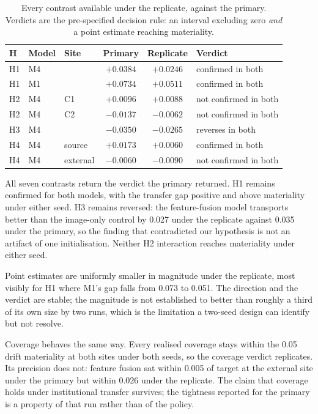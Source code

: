 \begin{table}[htbp]
\centering
\caption{Every contrast available under the replicate, against the primary.
Verdicts are the pre-specified decision rule: an interval excluding zero
\emph{and} a point estimate reaching materiality.}
\label{tab:seed-replicate}
\begin{tabular}{lllccl}
\toprule
H & Model & Site & Primary & Replicate & Verdict \\
\midrule
H1 & M4 &          & $+0.0384$ & $+0.0246$ & confirmed in both \\
H1 & M1 &          & $+0.0734$ & $+0.0511$ & confirmed in both \\
H2 & M4 & C1       & $+0.0096$ & $+0.0088$ & not confirmed in both \\
H2 & M4 & C2       & $-0.0137$ & $-0.0062$ & not confirmed in both \\
H3 & M4 &          & $-0.0350$ & $-0.0265$ & reverses in both \\
H4 & M4 & source   & $+0.0173$ & $+0.0060$ & confirmed in both \\
H4 & M4 & external & $-0.0060$ & $-0.0090$ & not confirmed in both \\
\bottomrule
\end{tabular}
\end{table}

All seven contrasts return the verdict the primary returned. H1 remains
confirmed for both models, with the transfer gap positive and above materiality
under either seed. H3 remains reversed: the feature-fusion model transports
better than the image-only control by \num{0.027} under the replicate against
\num{0.035} under the primary, so the finding that contradicted our hypothesis
is not an artifact of one initialisation. Neither H2 interaction reaches
materiality under either seed.

Point estimates are uniformly smaller in magnitude under the replicate, most
visibly for H1 where M1's gap falls from \num{0.073} to \num{0.051}. The
direction and the verdict are stable; the magnitude is not established to
better than roughly a third of its own size by two runs, which is the
limitation a two-seed design can identify but not resolve.

Coverage behaves the same way. Every realised coverage stays within the
\num{0.05} drift materiality at both sites under both seeds, so the coverage
verdict replicates. Its precision does not: feature fusion sat within
\num{0.005} of target at the external site under the primary but within
\num{0.026} under the replicate. The claim that coverage holds under
institutional transfer survives; the tightness reported for the primary is a
property of that run rather than of the policy.

